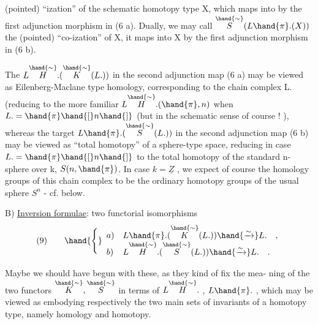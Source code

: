 
(pointed) ``ization'' of the schematic homotopy type X, 
 which maps into 
 by the first adjunction morphism in (6 a). Dually, we may call
$\overset{\hand{\sim}}{S}(L\hand{\pi}.(X))$ the (pointed) ``co-ization'' of X, it maps into X by the
first adjunction morphism in (6 b).

The  $L\overset{\hand{\sim}}{H}.(\overset{\hand{\sim}}{K}(L.))$ in the second adjunction map (6 a)
may be viewed as Eilenberg-Maclane type  homology, corresponding to the
chain complex L. \hand{,} (reducing to the  more familiar $L\overset{\hand{\sim}}{H}.(\hand{\pi},n)$
when $L. =\hand{\pi}\hand{[}n\hand{]}$\unsure{\hand{)}} (but in the schematic sense of course ! ), whereas
the target $L\hand{\pi}.(\overset{\hand{\sim}}{S}(L.))$ in the second adjunction map (6 b) may be viewed
as ``total homotopy'' of a sphere-type space, reducing \xout{(}in case $L. =\hand{\pi}\hand{[}n\hand{]}$\xout{)}
to the total homotopy of the standard n-sphere over k, $S(n,\hand{\pi})$. In case
$k=\underline{Z}$ , we expect of course  the homology groups of this chain
complex to be the ordinary homotopy groups of the usual sphere $S^n$ -
cf.  below.

B) \uline{Inversion formulae}: two functorial isomorphisms
\[
(9)\qquad \hand{\Bigg\{}\begin{array}{ll}
a) & L\hand{\pi}.(\overset{\hand{\sim}}{K}(L.)) \hand{\xrightarrow{\sim}} L. \quad , \\
b) & L\overset{\hand{\sim}}{H}.(\overset{\hand{\sim}}{S}(L.)) \hand{\xrightarrow{\sim}} L. \quad .
\end{array}
\]

Maybe we should have begun with these, as they kind of fix the mea-%
ning of the two functors $\overset{\hand{\sim}}{K},\overset{\hand{\sim}}{S}$ in terms of $L\overset{\hand{\sim}}{H}.$ , $L\hand{\pi}.$ , which may be
viewed as embodying respectively the two main sets of invariants of a
homotopy type, namely homology and homotopy.

